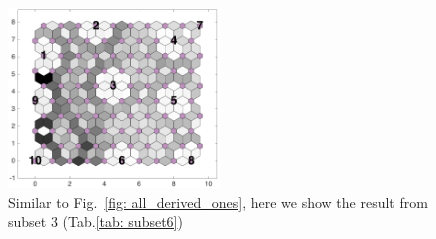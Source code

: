\begin{figure}
        \centering
        \includegraphics[width=0.5\textwidth]{../../images0.01/M31/2D/image_subsets/subset6_dist_with_hits_t.png}
    \caption{Similar to Fig.~\ref{fig: all_derived_ones}, here we show the result from subset 3 (Tab.\ref{tab: subset6})}
    \label{fig: subset6}
\end{figure}